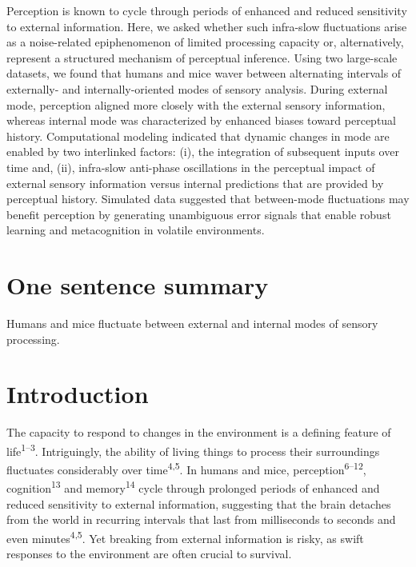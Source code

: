 \documentclass[
]{article}
\begin{document}
Perception is known to cycle through periods of enhanced and reduced
sensitivity to external information. Here, we asked whether such
infra-slow fluctuations arise as a noise-related epiphenomenon of
limited processing capacity or, alternatively, represent a structured
mechanism of perceptual inference. Using two large-scale datasets, we
found that humans and mice waver between alternating intervals of
externally- and internally-oriented modes of sensory analysis. During
external mode, perception aligned more closely with the external sensory
information, whereas internal mode was characterized by enhanced biases
toward perceptual history. Computational modeling indicated that dynamic
changes in mode are enabled by two interlinked factors: (i), the
integration of subsequent inputs over time and, (ii), infra-slow
anti-phase oscillations in the perceptual impact of external sensory
information versus internal predictions that are provided by perceptual
history. Simulated data suggested that between-mode fluctuations may
benefit perception by generating unambiguous error signals that enable
robust learning and metacognition in volatile environments.

\hypertarget{one-sentence-summary}{%
\section{One sentence summary}\label{one-sentence-summary}}

Humans and mice fluctuate between external and internal modes of sensory
processing.

\hfill\break

\newpage

\hypertarget{introduction}{%
\section{Introduction}\label{introduction}}

The capacity to respond to changes in the environment is a defining
feature of life\textsuperscript{1--3}. Intriguingly, the ability of
living things to process their surroundings fluctuates considerably over
time\textsuperscript{4,5}. In humans and mice,
perception\textsuperscript{6--12}, cognition\textsuperscript{13} and
memory\textsuperscript{14} cycle through prolonged periods of enhanced
and reduced sensitivity to external information, suggesting that the
brain detaches from the world in recurring intervals that last from
milliseconds to seconds and even minutes\textsuperscript{4,5}. Yet
breaking from external information is risky, as swift responses to the
environment are often crucial to survival.
\end{document}
